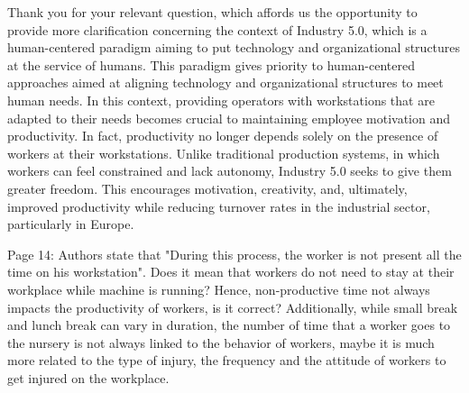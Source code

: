 \documentclass[preprint,11pt,3p]{elsarticle}
\begin{document}
\begin{tcolorbox}[colback=r_color1,colframe=r_color2,title=R4:]
Thank you for your relevant question, which affords us the opportunity to provide more clarification concerning the context of Industry 5.0, which is a human-centered paradigm aiming to put technology and organizational structures at the service of humans. 
This paradigm gives priority to human-centered approaches aimed at aligning technology and organizational structures to meet human needs. In this context, providing operators with workstations that are adapted to their needs becomes crucial to maintaining employee motivation and productivity. In fact, productivity no longer depends solely on the presence of workers at their workstations. Unlike traditional production systems, in which workers can feel constrained and lack autonomy, Industry 5.0 seeks to give them greater freedom. This encourages motivation, creativity, and, ultimately, improved productivity while reducing turnover rates in the industrial sector, particularly in Europe. 
\end{tcolorbox}

\begin{tcolorbox}[colback=q_color1,colframe=q_color2, title=Q5:] Page 14: Authors state that "During this process, the worker is not present all the time on his workstation". Does it mean that workers do not need to stay at their workplace while machine is running? Hence, non-productive time not always impacts the productivity of workers, is it correct? Additionally, while small break and lunch break can vary in duration, the number of time that a worker goes to the nursery is not always linked to the behavior of workers, maybe it is much more related to the type of injury, the frequency and the attitude of workers to get injured on the workplace.
\end{tcolorbox}
\end{document}
